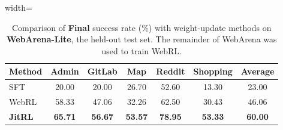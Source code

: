 
\begin{table}[t]
  \caption{
 Comparison of \textbf{Final} success rate (\%) with weight-update methods on \textbf{WebArena-Lite}, the held-out test set. The remainder of WebArena was used to train WebRL.
  }

  \label{tab:webrl_comparison}
  \begin{center}
    \begin{small}
      \begin{adjustbox}{width=\columnwidth}
      \begin{tabular}{lcccccc}
        \toprule
        \textbf{Method} & \textbf{Admin} & \textbf{GitLab} & \textbf{Map} & \textbf{Reddit} & \textbf{Shopping} & \textbf{Average} \\
        \midrule
       SFT    & 20.00 & 20.00 & 26.70 & 52.60 & 13.30 & 23.00 \\
        WebRL & 58.33 & 47.06 & 32.26 & 62.50 & 30.43 & 46.06 \\
        \textbf{JitRL} & \textbf{65.71} & \textbf{56.67} & \textbf{53.57} & \textbf{78.95} & \textbf{53.33} & \textbf{60.00} \\
        \bottomrule
      \end{tabular}
      \vspace{-8mm}
      \end{adjustbox}
    \end{small}
  \end{center}

\end{table}

